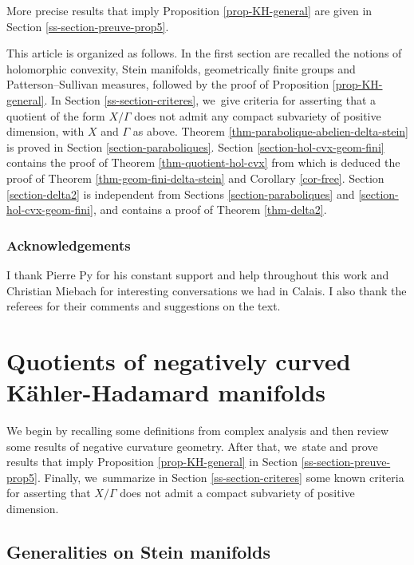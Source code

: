 \documentclass[11pt]{article}
\theoremstyle{definition}
\begin{document}
\noindent More precise results that imply Proposition \ref{prop-KH-general} are given in Section \ref{ss-section-preuve-prop5}.

This article is organized as follows. In the first section are recalled the notions of holomorphic convexity, Stein manifolds, geometrically finite groups and Patterson--Sullivan measures, followed by the proof of Proposition \ref{prop-KH-general}. In Section \ref{ss-section-criteres}, we~give criteria for asserting that a quotient of the form $X/\Gamma$ does not admit any compact subvariety of positive dimension, with $X$ and $\Gamma$ as above. Theorem \ref{thm-parabolique-abelien-delta-stein} is proved in Section \ref{section-paraboliques}. Section \ref{section-hol-cvx-geom-fini} contains the proof of Theorem \ref{thm-quotient-hol-cvx} from which is deduced the proof of Theorem \ref{thm-geom-fini-delta-stein} and Corollary \ref{cor-free}. Section \ref{section-delta2} is independent from Sections \ref{section-paraboliques} and \ref{section-hol-cvx-geom-fini}, and contains a proof of Theorem \ref{thm-delta2}.

\subsubsection*{Acknowledgements}
I thank Pierre Py for his constant support and help throughout this work and Christian Miebach for interesting conversations we had in Calais. I also thank the referees for their comments and suggestions on the text.

\section{Quotients of negatively curved Kähler-Hadamard manifolds}\label{section-kahler-hadamard}

We begin by recalling some definitions from complex analysis and then review some results of negative curvature geometry. After that, we~state and prove results that imply Proposition \ref{prop-KH-general} in Section \ref{ss-section-preuve-prop5}. Finally, we~summarize in Section \ref{ss-section-criteres} some known criteria for asserting that $X/\Gamma$ does not admit a compact subvariety of positive dimension.

\subsection{Generalities on Stein manifolds}\label{ss-section-stein}
\end{document}
